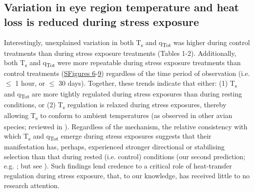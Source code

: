 \documentclass[12pt]{article}
\begin{document}
\subsection{Variation in eye region temperature and heat loss is reduced during stress exposure}
\vspace{0.5cm}

\noindent Interestingly, unexplained variation in both T\textsubscript{s} and q\textsubscript{Tot} was higher during control treatments than during stress exposure treatments (Tables 1-2). Additionally, both T\textsubscript{s} and q\textsubscript{Tot} were more repeatable during stress exposure treatments than control treatments (\hyperref[FigC.6]{SFigures 6}-\hyperref[FigC.9]{9}) regardless of the time period of observation (i.e. $\leq$ 1 hour, or $\leq$ 30 days). Together, these trends indicate that either: (1) T\textsubscript{s} and q\textsubscript{Tot} are more tightly regulated during stress exposures than during resting conditions, or (2) T\textsubscript{s} regulation is relaxed during stress exposures, thereby allowing T\textsubscript{s} to conform to ambient temperatures (as observed in other avian species; reviewed in \citealt{angilletta_2019}). Regardless of the mechanism, the relative consistency with which T\textsubscript{s} and q\textsubscript{Tot} emerge during stress exposures suggests that their manifestation has, perhaps, experienced stronger directional or stabilising selection than that during rested (i.e. control) conditions (our second prediction; e.g. \citealt{gibson_1974,lande_1983,vanhomrigh_2007}; but see \citealt{kotiaho_2001}). Such findings lend credence to a critical role of heat-transfer regulation during stress exposure, that, to our knowledge, has received little to no research attention. \vspace{1cm}
\end{document}

